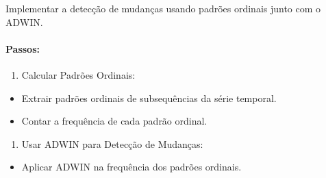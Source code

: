 \documentclass[
]{article}
\providecommand{\tightlist}{%
  \setlength{\itemsep}{0pt}\setlength{\parskip}{0pt}}
\begin{document}
Implementar a detecção de mudanças usando padrões ordinais junto com o
ADWIN.

\hypertarget{passos}{%
\paragraph{Passos:}\label{passos}}

\begin{enumerate}
\def\labelenumi{\arabic{enumi}.}
\tightlist
\item
  Calcular Padrões Ordinais:
\end{enumerate}

\begin{itemize}
\item
  Extrair padrões ordinais de subsequências da série temporal.
\item
  Contar a frequência de cada padrão ordinal.
\end{itemize}

\begin{enumerate}
\def\labelenumi{\arabic{enumi}.}
\setcounter{enumi}{1}
\tightlist
\item
  Usar ADWIN para Detecção de Mudanças:
\end{enumerate}

\begin{itemize}
\tightlist
\item
  Aplicar ADWIN na frequência dos padrões ordinais.
\end{itemize}
\end{document}
